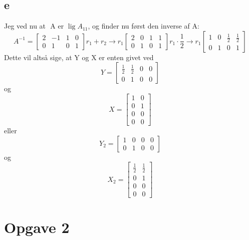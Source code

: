 \documentclass{article}
\begin{document}
\subsection*{e}
Jeg ved nu at $\text { A er } \operatorname{lig} A_{11}$, og finder nu først den inverse af A:
$$A^{-1}=\left[\begin{array}{cc|cc}
2 & -1 & 1 & 0 \\
0 & 1 & 0 & 1
\end{array}\right] r_1+r_2 \rightarrow r_1 \left[\begin{array}{ll|ll}
2 & 0 & 1 & 1 \\
0 & 1 & 0 & 1
\end{array}\right] r_1 \cdot \frac{1}{2} \rightarrow r_1 \left[\begin{array}{ll|ll}
1 & 0 & \frac{1}{2} & \frac{1}{2} \\
0 & 1 & 0 & 1
\end{array}\right]$$
Dette vil altså sige, at Y og X er enten givet ved
$$Y=\left[\begin{array}{llll}
\frac{1}{2} & \frac{1}{2} & 0 & 0 \\
0 & 1 & 0 & 0
\end{array}\right]$$
og
$$X=\left[\begin{array}{ll}
1 & 0 \\
0 & 1 \\
0 & 0 \\
0 & 0
\end{array}\right]$$
eller
$$Y_2=\left[\begin{array}{llll}
1 & 0 & 0 & 0 \\
0 & 1 & 0 & 0
\end{array}\right]$$
og
$$X_2=\left[\begin{array}{ll}
\frac{1}{2} & \frac{1}{2} \\
0 & 1 \\
0 & 0 \\
0 & 0
\end{array}\right]$$

\section*{Opgave 2}
\end{document}
